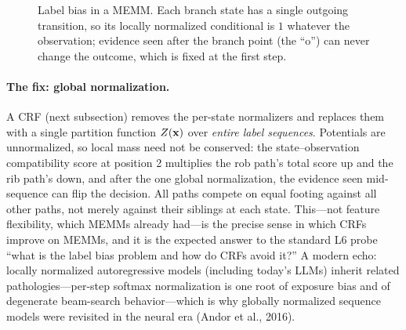 \begin{figure}[H]
\centering
{}
\caption{Label bias in a MEMM.  Each branch state has a single outgoing
transition, so its locally normalized conditional is $1$ whatever the
observation; evidence seen after the branch point (the ``o'') can never change
the outcome, which is fixed at the first step.}
\label{fig:label_bias}
\end{figure}

\paragraph{The fix: global normalization.}
A CRF (next subsection) removes the per-state normalizers and replaces them
with a single partition function $Z(\mathbf{x})$ over \emph{entire label sequences}.
Potentials are unnormalized, so local mass need not be conserved: the
state--observation compatibility score at position 2 multiplies the rob path's
total score up and the rib path's down, and after the one global
normalization, the evidence seen mid-sequence can flip the decision.  All
paths compete on equal footing against all other paths, not merely against
their siblings at each state.  This---not feature flexibility, which MEMMs
already had---is the precise sense in which CRFs improve on MEMMs, and it is
the expected answer to the standard L6 probe ``what is the label bias problem
and how do CRFs avoid it?''  A modern echo: locally normalized autoregressive
models (including today's LLMs) inherit related pathologies---per-step
softmax normalization is one root of exposure bias and of degenerate
beam-search behavior---which is why globally normalized sequence models were
revisited in the neural era (Andor et al., 2016).

